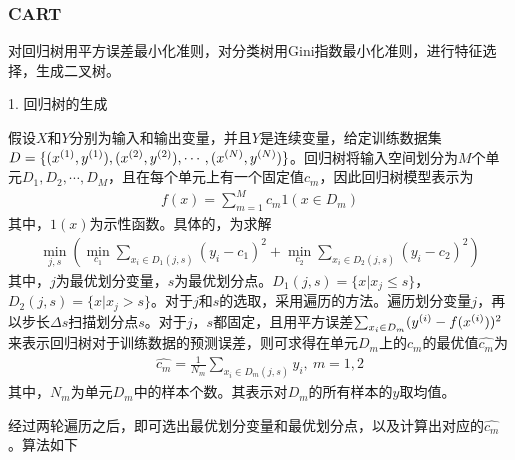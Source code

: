 \subsubsection{CART}
对回归树用平方误差最小化准则，对分类树用Gini指数最小化准则，进行特征选择，生成二叉树。

1. 回归树的生成

假设$X$和$Y$分别为输入和输出变量，并且$Y$是连续变量，给定训练数据集$ D=\{ ({x}^{({1})},{y}^{({1})}),({x}^{({2})},{y}^{({2})}),\cdots,({x}^{({N})},{y}^{({N})}) \} $。回归树将输入空间划分为$M$个单元$D_1,D_2,\cdots,D_M$，且在每个单元上有一个固定值$c_m$，因此回归树模型表示为
\begin{eqnarray}
f(x)=\sum_{m=1}^M c_m1(x\in D_m)
\end{eqnarray}
其中，$1(x)$为示性函数。具体的，为求解
\begin{eqnarray}
\min_{j,s}
\left(
	\min_{c_1}\sum_{x_i\in D_1(j,s)}(y_i-c_1)^2+\min_{c_2}\sum_{x_i\in D_2(j,s)}(y_i-c_2)^2
\right)
\end{eqnarray}
其中，$j$为最优划分变量，$s$为最优划分点。$D_1(j,s)=\{x|x_j\leq s\}$，$D_2(j,s)=\{x|x_j> s\}$。对于$j$和$s$的选取，采用遍历的方法。遍历划分变量$j$，再以步长$\Delta s$扫描划分点$s$。对于$j$，$s$都固定，且用平方误差$\sum_{x_i\in D_m}({y}^{({i})}-f({x}^{({i})}))^2$来表示回归树对于训练数据的预测误差，则可求得在单元$D_m$上的$c_m$的最优值$\hat{c_m}$为
\begin{eqnarray}
\hat{c_m}=\frac{1}{N_m}\sum_{x_i\in D_m(j,s)}y_i,\ m=1,2
\end{eqnarray}
其中，$N_m$为单元$D_m$中的样本个数。其表示对$D_m$的所有样本的$y$取均值。

经过两轮遍历之后，即可选出最优划分变量和最优划分点，以及计算出对应的$\hat{c_m}$。算法如下


